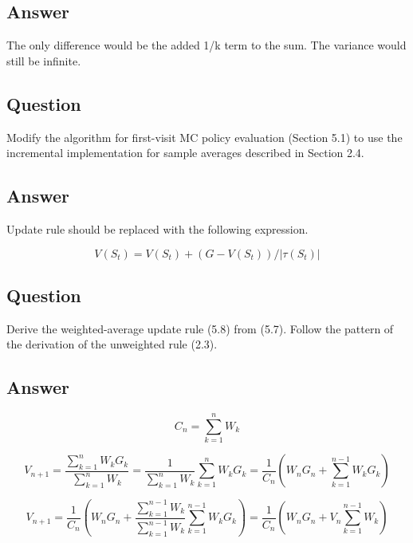 \documentclass[11pt]{article}
\begin{document}
    \subsection*{Answer}

    The only difference would be the added 1/k term to the sum.
    The variance would still be infinite.

    \subsection{Question}

    Modify the algorithm for first-visit MC policy evaluation (Section 5.1) to use the incremental implementation for sample averages described in Section 2.4.

    \subsection*{Answer}

    Update rule should be replaced with the following expression.

    \begin{equation}
        V(S_{t}) = V(S_{t}) + (G - V(S_{t})) / |\tau(S_{t})|
    \end{equation}

    \subsection{Question}

    Derive the weighted-average update rule (5.8) from (5.7).
    Follow the pattern of the derivation of the unweighted rule (2.3).

    \subsection*{Answer}

    \begin{equation}
        C_{n}= \sum_{k=1}^{n} W_{k}
    \end{equation}

    \begin{equation}
        V_{n+1}=\frac{ \sum_{k=1}^{n} W_{k} G_{k}  }{ \sum_{k=1}^{n} W_{k} } = \frac{ 1 }{ \sum_{k=1}^{n} W_{k} } \sum_{k=1}^{n} W_{k} G_{k} = \frac{ 1 }{ C_{n} } ( W_{n} G_{n} +  \sum_{k=1}^{n - 1} W_{k} G_{k} )
    \end{equation}

    \begin{equation}
        V_{n+1} = \frac{ 1 }{ C_{n} } ( W_{n} G_{n} +  \frac{ \sum_{k=1}^{n-1} W_{k} }{ \sum_{k=1}^{n-1} W_{k} } \sum_{k=1}^{n - 1} W_{k} G_{k} ) = \frac{ 1 }{ C_{n} } ( W_{n} G_{n} + V_{n} \sum_{k=1}^{n-1} W_{k}  )
    \end{equation}
\end{document}
